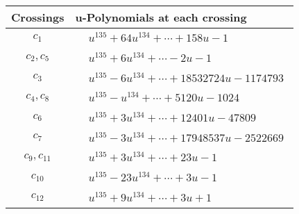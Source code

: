 \documentclass[1p]{elsarticle_modified}
\theoremstyle{definition}
\begin{document}
\begin{tabular}{m{50pt}|m{274pt}}
Crossings & \hspace{64pt}u-Polynomials at each crossing \\
\hline $$\begin{aligned}c_{1}\end{aligned}$$&$\begin{aligned}
&u^{135}+64 u^{134}+\cdots+158 u-1
\end{aligned}$\\
\hline $$\begin{aligned}c_{2},c_{5}\end{aligned}$$&$\begin{aligned}
&u^{135}+6 u^{134}+\cdots-2 u-1
\end{aligned}$\\
\hline $$\begin{aligned}c_{3}\end{aligned}$$&$\begin{aligned}
&u^{135}-6 u^{134}+\cdots+18532724 u-1174793
\end{aligned}$\\
\hline $$\begin{aligned}c_{4},c_{8}\end{aligned}$$&$\begin{aligned}
&u^{135}- u^{134}+\cdots+5120 u-1024
\end{aligned}$\\
\hline $$\begin{aligned}c_{6}\end{aligned}$$&$\begin{aligned}
&u^{135}+3 u^{134}+\cdots+12401 u-47809
\end{aligned}$\\
\hline $$\begin{aligned}c_{7}\end{aligned}$$&$\begin{aligned}
&u^{135}-3 u^{134}+\cdots+17948537 u-2522669
\end{aligned}$\\
\hline $$\begin{aligned}c_{9},c_{11}\end{aligned}$$&$\begin{aligned}
&u^{135}+3 u^{134}+\cdots+23 u-1
\end{aligned}$\\
\hline $$\begin{aligned}c_{10}\end{aligned}$$&$\begin{aligned}
&u^{135}-23 u^{134}+\cdots+3 u-1
\end{aligned}$\\
\hline $$\begin{aligned}c_{12}\end{aligned}$$&$\begin{aligned}
&u^{135}+9 u^{134}+\cdots+3 u+1
\end{aligned}$\\
\hline
\end{tabular}\\~\\
\end{document}
